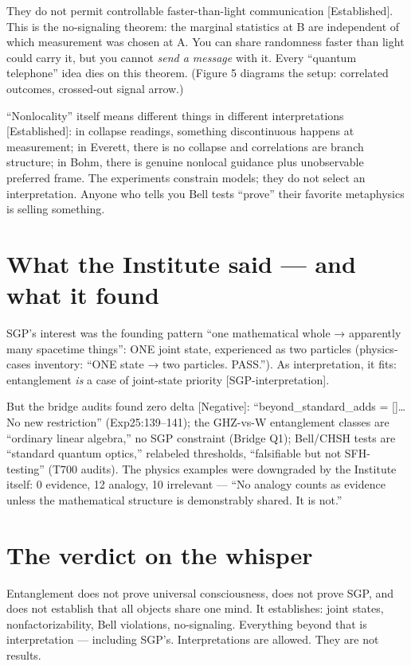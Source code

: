 \documentclass[
  11pt,
]{book}
\begin{document}
They do not permit controllable faster-than-light communication
{[}Established{]}. This is the no-signaling theorem: the marginal
statistics at B are independent of which measurement was chosen at A.
You can share randomness faster than light could carry it, but you
cannot \emph{send a message} with it. Every ``quantum telephone'' idea
dies on this theorem. (Figure 5 diagrams the setup: correlated outcomes,
crossed-out signal arrow.)

``Nonlocality'' itself means different things in different
interpretations {[}Established{]}: in collapse readings, something
discontinuous happens at measurement; in Everett, there is no collapse
and correlations are branch structure; in Bohm, there is genuine
nonlocal guidance plus unobservable preferred frame. The experiments
constrain models; they do not select an interpretation. Anyone who tells
you Bell tests ``prove'' their favorite metaphysics is selling
something.

\section{What the Institute said --- and what it
found}\label{what-the-institute-said-and-what-it-found}

SGP's interest was the founding pattern ``one mathematical whole →
apparently many spacetime things'': ONE joint state, experienced as two
particles (physics-cases inventory: ``ONE state → two particles.
PASS.''). As interpretation, it fits: entanglement \emph{is} a case of
joint-state priority {[}SGP-interpretation{]}.

But the bridge audits found zero delta {[}Negative{]}:
``beyond\_standard\_adds = {[}{]}\ldots{} No new restriction''
(Exp25:139--141); the GHZ-vs-W entanglement classes are ``ordinary
linear algebra,'' no SGP constraint (Bridge Q1); Bell/CHSH tests are
``standard quantum optics,'' relabeled thresholds, ``falsifiable but not
SFH-testing'' (T700 audits). The physics examples were downgraded by the
Institute itself: 0 evidence, 12 analogy, 10 irrelevant --- ``No analogy
counts as evidence unless the mathematical structure is demonstrably
shared. It is not.''

\section{The verdict on the whisper}\label{the-verdict-on-the-whisper}

Entanglement does not prove universal consciousness, does not prove SGP,
and does not establish that all objects share one mind. It establishes:
joint states, nonfactorizability, Bell violations, no-signaling.
Everything beyond that is interpretation --- including SGP's.
Interpretations are allowed. They are not results.
\end{document}
